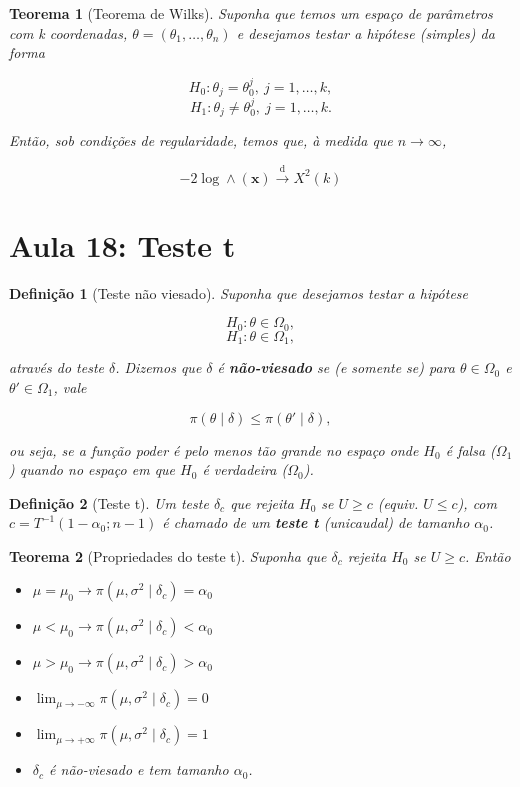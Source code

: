 \documentclass{article}
\newtheorem{theorem}{Teorema}
\newtheorem{definition}{Definição}
\begin{document}
\begin{theorem}[Teorema de Wilks]
Suponha que temos um espaço de parâmetros com k coordenadas, $\theta = (\theta_1, \ldots, \theta_n)$ e desejamos testar a hipótese (simples) da forma

$$H_0 : \theta_j = \theta_0^j, \ j = 1, \ldots, k,$$
$$H_1 : \theta_j \neq \theta_0^j, \ j = 1, \ldots, k.$$

Então, sob condições de regularidade, temos que, à medida que $n \rightarrow \infty$,

$$-2 \log \wedge(\textbf{x}) \stackrel{\mathrm{d}}{\rightarrow} X^2 (k)$$
\end{theorem}

\section*{Aula 18: Teste t}\label{s18}
\begin{definition}[Teste não viesado]
Suponha que desejamos testar a hipótese

$$H_0 : \theta \in \Omega_0,$$
$$H_1 : \theta \in \Omega_1,$$

através do teste $\delta$. Dizemos que $\delta$ é \textbf{não-viesado} se (e somente se) para $\theta \in \Omega_0$ e $\theta' \in \Omega_1$, vale

$$\pi (\theta \mid \delta) \leq \pi (\theta' \mid \delta),$$

ou seja, se a função poder é pelo menos tão grande no espaço onde $H_0$ é falsa ($\Omega_1$) quando no espaço em que $H_0$ é verdadeira ($\Omega_0$).
\end{definition}

\begin{definition}[Teste t]
Um teste $\delta_c$ que rejeita $H_0$ se $U \geq c$ (equiv. $U \leq c$), com $c = T^{-1}(1 - \alpha_0; n - 1)$ é chamado de um \textbf{teste t} (unicaudal) de tamanho $\alpha_0$.
\end{definition}

\begin{theorem}[Propriedades do teste t]
Suponha que $\delta_c$ rejeita $H_0$ se $U \geq c$. Então

\begin{itemize}
    \item $\mu = \mu_0 \rightarrow \pi(\mu, \sigma^2 \mid \delta_c) = \alpha_0$
    
    \item $\mu < \mu_0 \rightarrow \pi(\mu, \sigma^2 \mid \delta_c) < \alpha_0$
    
    \item $\mu > \mu_0 \rightarrow \pi(\mu, \sigma^2 \mid \delta_c) > \alpha_0$
    
    \item $\lim_{\mu \rightarrow -\infty} \pi(\mu, \sigma^2 \mid \delta_c) = 0$
    
    \item $\lim_{\mu \rightarrow +\infty} \pi(\mu, \sigma^2 \mid \delta_c) = 1$
    
    \item $\delta_c$ é não-viesado e tem tamanho $\alpha_0$.
\end{itemize}
\end{theorem}
\end{document}

